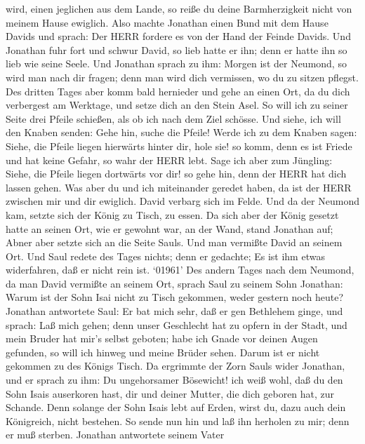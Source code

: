 wird, einen jeglichen aus dem Lande, so reiße du deine Barmherzigkeit
nicht von meinem Hause ewiglich.  Also machte Jonathan
einen Bund mit dem Hause Davids und sprach: Der HERR fordere es von der
Hand der Feinde Davids.  Und Jonathan fuhr fort und schwur
David, so lieb hatte er ihn; denn er hatte ihn so lieb wie seine Seele.
 Und Jonathan sprach zu ihm: Morgen ist der Neumond, so
wird man nach dir fragen; denn man wird dich vermissen, wo du zu sitzen
pflegst.  Des dritten Tages aber komm bald hernieder und
gehe an einen Ort, da du dich verbergest am Werktage, und setze dich an
den Stein Asel.  So will ich zu seiner Seite drei Pfeile
schießen, als ob ich nach dem Ziel schösse.  Und siehe, ich
will den Knaben senden: Gehe hin, suche die Pfeile! Werde ich zu dem
Knaben sagen: Siehe, die Pfeile liegen hierwärts hinter dir, hole sie!
so komm, denn es ist Friede und hat keine Gefahr, so wahr der HERR lebt.
 Sage ich aber zum Jüngling: Siehe, die Pfeile liegen
dortwärts vor dir! so gehe hin, denn der HERR hat dich lassen gehen.
 Was aber du und ich miteinander geredet haben, da ist der
HERR zwischen mir und dir ewiglich.  David verbarg sich im
Felde. Und da der Neumond kam, setzte sich der König zu Tisch, zu essen.
 Da sich aber der König gesetzt hatte an seinen Ort, wie er
gewohnt war, an der Wand, stand Jonathan auf; Abner aber setzte sich an
die Seite Sauls. Und man vermißte David an seinem Ort.  Und
Saul redete des Tages nichts; denn er gedachte; Es ist ihm etwas
widerfahren, daß er nicht rein ist.  `01961' Des andern
Tages nach dem Neumond, da man David vermißte an seinem Ort, sprach Saul
zu seinem Sohn Jonathan: Warum ist der Sohn Isai nicht zu Tisch
gekommen, weder gestern noch heute?  Jonathan antwortete
Saul: Er bat mich sehr, daß er gen Bethlehem ginge,  und
sprach: Laß mich gehen; denn unser Geschlecht hat zu opfern in der
Stadt, und mein Bruder hat mir's selbst geboten; habe ich Gnade vor
deinen Augen gefunden, so will ich hinweg und meine Brüder sehen. Darum
ist er nicht gekommen zu des Königs Tisch.  Da ergrimmte
der Zorn Sauls wider Jonathan, und er sprach zu ihm: Du ungehorsamer
Bösewicht! ich weiß wohl, daß du den Sohn Isais auserkoren hast, dir und
deiner Mutter, die dich geboren hat, zur Schande.  Denn
solange der Sohn Isais lebt auf Erden, wirst du, dazu auch dein
Königreich, nicht bestehen. So sende nun hin und laß ihn herholen zu
mir; denn er muß sterben.  Jonathan antwortete seinem Vater
